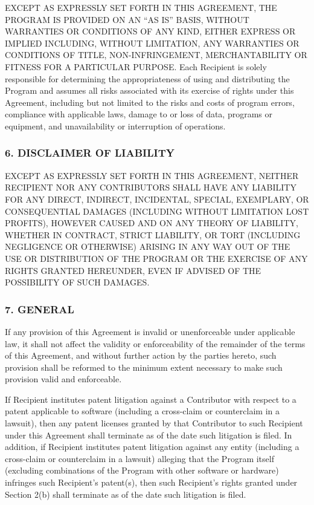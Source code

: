 EXCEPT AS EXPRESSLY SET FORTH IN THIS AGREEMENT,
THE PROGRAM IS PROVIDED ON AN ``AS IS'' BASIS, WITHOUT WARRANTIES OR
CONDITIONS OF ANY KIND, EITHER EXPRESS OR IMPLIED INCLUDING, WITHOUT
LIMITATION, ANY WARRANTIES OR CONDITIONS OF TITLE, NON-INFRINGEMENT,
MERCHANTABILITY OR FITNESS FOR A PARTICULAR PURPOSE. Each Recipient is solely responsible for determining the appropriateness of using and distributing the Program and assumes all risks associated with its exercise of rights under this Agreement,
including but not limited to the risks and costs of program errors,
compliance with applicable laws, damage to or loss of data, programs or equipment, and unavailability or interruption of operations.  

\subsubsection*{6.  DISCLAIMER OF LIABILITY}


EXCEPT AS EXPRESSLY SET
FORTH IN THIS AGREEMENT, NEITHER RECIPIENT NOR ANY CONTRIBUTORS SHALL
HAVE ANY LIABILITY FOR ANY DIRECT, INDIRECT, INCIDENTAL, SPECIAL,
EXEMPLARY, OR CONSEQUENTIAL DAMAGES (INCLUDING WITHOUT LIMITATION LOST PROFITS),
HOWEVER CAUSED AND ON ANY THEORY OF LIABILITY, WHETHER IN CONTRACT,
STRICT LIABILITY, OR TORT (INCLUDING NEGLIGENCE OR OTHERWISE) ARISING
IN ANY WAY OUT OF THE USE OR DISTRIBUTION OF THE PROGRAM OR THE
EXERCISE OF ANY RIGHTS GRANTED HEREUNDER, EVEN IF ADVISED OF THE
POSSIBILITY OF SUCH DAMAGES.


\subsubsection*{7.  GENERAL}


If any provision of this
Agreement is invalid or unenforceable under applicable law, it shall
not affect the validity or enforceability of the remainder of the terms
of this Agreement, and without further action by the parties hereto,
such provision shall be reformed to the minimum extent necessary to
make such provision valid and enforceable.


If Recipient institutes patent litigation against
a Contributor with respect to a patent applicable to software
(including a cross-claim or counterclaim in a lawsuit), then any patent
licenses granted by that Contributor to such Recipient under this
Agreement shall terminate as of the date such litigation is filed. In
addition, if Recipient institutes patent litigation against any entity
(including a cross-claim or counterclaim in a lawsuit) alleging that
the Program itself (excluding combinations of the Program with other
software or hardware) infringes such Recipient's patent(s), then such
Recipient's rights granted under Section 2(b) shall terminate as of the
date such litigation is filed. 



